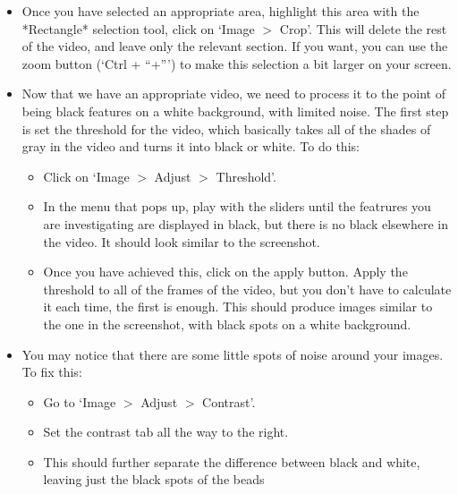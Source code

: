 \begin{itemize}
\itemsep-0.3em
\item Once you have selected an appropriate area, highlight this area with the *Rectangle* selection tool, click on `Image $>$ Crop'. 
This will delete the rest of the video, and leave only the relevant section. 
If you want, you can use the zoom button (`Ctrl + ``+''') to make this selection a bit larger on your screen.
\item Now that we have an appropriate video, we need to process it to the point of being black features on a white background, with limited noise. 
The first step is set the threshold for the video, which basically takes all of the shades of gray in the video and turns it into black or white. 
To do this:
\begin{itemize}
\item Click on `Image $>$ Adjust $>$ Threshold'. 
\item In the menu that pops up, play with the sliders until the featrures you are investigating are displayed in black, but there is no black elsewhere in the video. 
It should look similar to the screenshot. 
\item Once you have achieved this, click on the apply button. 
Apply the threshold to all of the frames of the video, but you don't have to calculate it each time, the first is enough. This should produce images similar to the one in the screenshot, with black spots on a white background.
\end{itemize}
\item You may notice that there are some little spots of noise around your images. 
To fix this:
\begin{itemize}
\item Go to `Image $>$ Adjust $>$ Contrast'.
\item Set the contrast tab all the way to the right.
\item This should further separate the difference between black and white, leaving just the black spots of the beads
\end{itemize}
\end{itemize}
